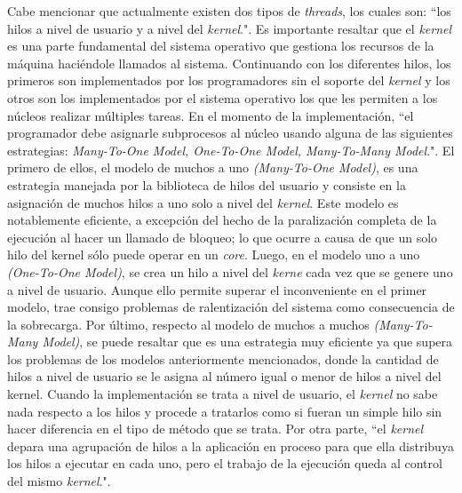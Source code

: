 \documentclass[12pt,letterpaper]{article}
\begin{document}
\newline
\newline
Cabe mencionar que actualmente existen dos tipos de \textit{threads}, los cuales son: ``los hilos a nivel de usuario y a nivel del \textit{kernel}."\cite{c10}. Es importante resaltar que el \textit{kernel} es una parte fundamental del sistema operativo que gestiona los recursos de la máquina haciéndole llamados al sistema. Continuando con los diferentes hilos, los primeros son implementados por los programadores sin el soporte del \textit{kernel} y los otros son los implementados por el sistema operativo los que les permiten a los núcleos realizar múltiples tareas.
\newline
\newline
En el momento de la implementación, ``el programador debe asignarle subprocesos al núcleo usando alguna de las siguientes estrategias: \textit{Many-To-One Model, One-To-One Model, Many-To-Many Model}."\cite{c4}. El primero de ellos, el modelo de muchos a uno \textit{(Many-To-One Model)}, es una estrategia manejada por la biblioteca de hilos del usuario y consiste en la asignación de muchos hilos a uno solo a nivel del \textit{kernel}. Este modelo es notablemente eficiente, a excepción del hecho de la paralización completa de la ejecución al hacer un llamado de bloqueo; lo que ocurre a causa de que un solo hilo del kernel sólo puede operar en un \textit{core}. Luego, en el modelo uno a uno \textit{(One-To-One Model)}, se crea un hilo a nivel del \textit{kerne} cada vez que se genere uno a nivel de usuario. Aunque ello permite superar el inconveniente en el primer modelo, trae consigo problemas de ralentización del sistema como consecuencia de la sobrecarga. Por último, respecto al modelo de muchos a muchos \textit{(Many-To-Many Model)}, se puede resaltar que es una estrategia muy eficiente ya que supera los problemas de los modelos anteriormente mencionados, donde la cantidad de hilos a nivel de usuario se le asigna al número igual o menor de hilos a nivel del kernel.
\newline
\newline
Cuando la implementación se trata a nivel de usuario, el \textit{kernel} no sabe nada respecto a los hilos y procede a tratarlos como si fueran un simple hilo sin hacer diferencia en el tipo de método que se trata. Por otra parte, ``el \textit{kernel} depara una agrupación de hilos a la aplicación en proceso para que ella distribuya los hilos a ejecutar en cada uno, pero el trabajo de la ejecución queda al control del mismo \textit{kernel}."\cite{c13}. 
\end{document}

